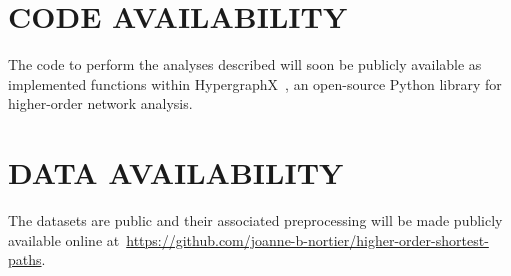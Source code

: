 \documentclass[a4paper,pre,reqno,superscriptaddress, twocolumn, floatfix]{revtex4}
\def\ho{higher-order }
\begin{document}
\section*{CODE AVAILABILITY}
The code to perform the analyses described will soon be publicly available as implemented functions within HypergraphX~\cite{lotito2023hypergraphx}, an open-source Python library for \ho network analysis.


\section*{DATA AVAILABILITY}
The datasets are public and their associated preprocessing will be made publicly available online at~\url{https://github.com/joanne-b-nortier/higher-order-shortest-paths}.




\end{document}
